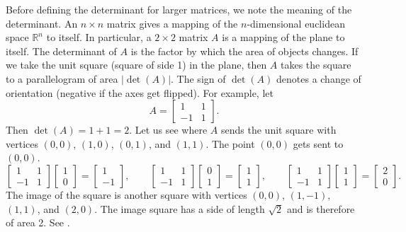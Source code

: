 Before defining the
determinant for larger matrices, we note
the meaning of the determinant.
An $n \times n$ matrix
gives a mapping of the $n$-dimensional euclidean space ${\mathbb{R}}^n$ to 
itself.
In particular, a $2 \times 2$ matrix $A$ is a mapping of
the plane to itself.  The determinant of 
$A$ is the factor by which the area of objects changes. 
If we take the unit square (square of side 1) in the plane, then
$A$ takes the square to a parallelogram of area $\lvert\det(A)\rvert$.  The sign
of $\det(A)$ denotes a change of orientation (negative if the axes get flipped).  For
example, let
\begin{equation*}
A =
\begin{bmatrix}
1 & 1 \\
-1 & 1
\end{bmatrix} .
\end{equation*}
Then $\det(A) = 1+1 = 2$.
Let us see where $A$ sends the unit square with vertices
$(0,0)$, $(1,0)$, $(0,1)$, and $(1,1)$.
The point $(0,0)$ gets sent
to $(0,0)$.  
\begin{equation*}
\begin{bmatrix}
1 & 1 \\
-1 & 1
\end{bmatrix}
\begin{bmatrix}
1 \\ 0
\end{bmatrix} =
\begin{bmatrix}
1 \\
-1 
\end{bmatrix}
,
\qquad
\begin{bmatrix}
1 & 1 \\
-1 & 1
\end{bmatrix}
\begin{bmatrix}
0 \\ 1
\end{bmatrix} =
\begin{bmatrix}
1 \\
1 
\end{bmatrix}
,
\qquad
\begin{bmatrix}
1 & 1 \\
-1 & 1
\end{bmatrix}
\begin{bmatrix}
1 \\ 1
\end{bmatrix} =
\begin{bmatrix}
2 \\
0 
\end{bmatrix}
.
\end{equation*}
The image of the square is another square with vertices $(0,0)$, $(1,-1)$,
$(1,1)$, and $(2,0)$.  The
image square has
a side of length $\sqrt{2}$ and is therefore of area 2.  See
.

